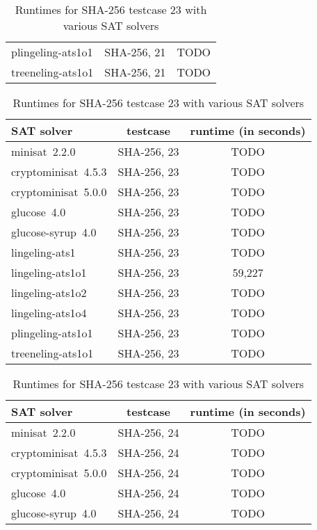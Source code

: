 \begin{table}[!h]
\begin{center}
\begin{tabular}{lcc}
      plingeling-ats1o1         & SHA-256, 21   & TODO \\
      treeneling-ats1o1         & SHA-256, 21   & TODO
    \end{tabular}
    \caption{Runtimes for SHA-256 testcase 21 with various SAT solvers}
    \label{tab:SHA-256-21-runtimes}
  \end{center}
  \begin{center}
    \begin{tabular}{lcc}
      SAT solver                & testcase      & runtime (in seconds) \\
    \hline
      minisat~2.2.0             & SHA-256, 23   & TODO \\
      cryptominisat~4.5.3       & SHA-256, 23   & TODO \\
      cryptominisat~5.0.0       & SHA-256, 23   & TODO \\
      glucose~4.0               & SHA-256, 23   & TODO \\
      glucose-syrup~4.0         & SHA-256, 23   & TODO \\
      lingeling-ats1            & SHA-256, 23   & TODO \\
      lingeling-ats1o1          & SHA-256, 23   & 59,227 \\
      lingeling-ats1o2          & SHA-256, 23   & TODO \\
      lingeling-ats1o4          & SHA-256, 23   & TODO \\
      plingeling-ats1o1         & SHA-256, 23   & TODO \\
      treeneling-ats1o1         & SHA-256, 23   & TODO
    \end{tabular}
    \caption{Runtimes for SHA-256 testcase 23 with various SAT solvers}
    \label{tab:SHA-256-23-runtimes}
  \end{center}
  \begin{center}
    \begin{tabular}{lcc}
      SAT solver                & testcase      & runtime (in seconds) \\
    \hline
      minisat~2.2.0             & SHA-256, 24   & TODO \\
      cryptominisat~4.5.3       & SHA-256, 24   & TODO \\
      cryptominisat~5.0.0       & SHA-256, 24   & TODO \\
      glucose~4.0               & SHA-256, 24   & TODO \\
      glucose-syrup~4.0         & SHA-256, 24   & TODO \\

\end{tabular}
\end{center}
\end{table}
